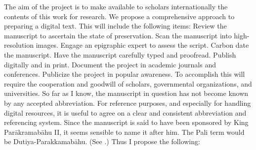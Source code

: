 {}The aim of the project is to make available to scholars internationally the contents of this work for research. We propose a comprehensive approach to preparing a digital text. This will include the following items:\markdownRendererInterblockSeparator
{}\markdownRendererUlBegin
\markdownRendererUlItem Review the manuscript to ascertain the state of preservation.\markdownRendererUlItemEnd 
\markdownRendererUlItem Scan the manuscript into high-resolution images.\markdownRendererUlItemEnd 
\markdownRendererUlItem Engage an epigraphic expert to assess the script.\markdownRendererUlItemEnd 
\markdownRendererUlItem Carbon date the manuscript.\markdownRendererUlItemEnd 
\markdownRendererUlItem Have the manuscript carefully typed and proofread.\markdownRendererUlItemEnd 
\markdownRendererUlItem Publish digitally and in print.\markdownRendererUlItemEnd 
\markdownRendererUlItem Document the project in academic journals and conferences.\markdownRendererUlItemEnd 
\markdownRendererUlItem Publicize the project in popular awareness.\markdownRendererUlItemEnd 
\markdownRendererUlEnd \markdownRendererInterblockSeparator
{}To accomplish this will require the cooperation and goodwill of scholars, governmental organizations, and universities.\markdownRendererInterblockSeparator
{}\markdownRendererInterblockSeparator
{}So far as I know, the manuscript in question has not become known by any accepted abbreviation. For reference purposes, and especially for handling digital resources, it is useful to agree on a clear and consistent abbreviation and referencing system.\markdownRendererInterblockSeparator
{}\markdownRendererInterblockSeparator
{}Since the manuscript is said to have been sponsored by King Parākramabāhu II, it seems sensible to name it after him. The Pali term would be Dutiya-Parakkamabāhu. (See  .) Thus I propose the following:\markdownRendererInterblockSeparator
{}\markdownRendererBlockQuoteBegin
{}
\markdownRendererBlockQuoteEnd \markdownRendererInterblockSeparator
